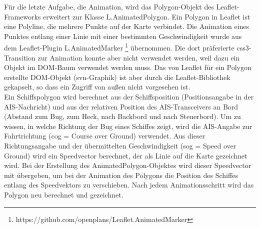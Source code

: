 Für díe letzte Aufgabe, die Animation, wird das Polygon-Objekt des Leaflet-Frameworks erweitert zur Klasse L.AnimatedPolygon. Ein Polygon in Leaflet ist eine Polyline, die mehrere Punkte auf der Karte verbindet. Die Animation eines Punktes entlang einer Linie mit einer bestimmten Geschwindigkeit wurde aus dem Leaflet-Plugin L.AnimatedMarker \footnote{\label{foot:2}https://github.com/openplans/Leaflet.AnimatedMarker} übernommen. Die dort präferierte css3-Transition zur Animation konnte aber nicht verwendet werden, weil dazu ein Objekt im DOM-Baum verwendet werden muss. Das von Leaflet für ein Polygon erstellte DOM-Objekt (svn-Graphik) ist aber durch die Leaflet-Bibliothek gekapselt, so dass ein Zugriff von außen nicht vorgesehen ist.  \\

Ein Schiffspolygon wird berechnet aus der Schiffsposition (Positionsangabe in der AIS-Nachricht) und aus der relativen Position des AIS-Transceivers an Bord (Abstand zum Bug, zum Heck, nach Backbord und nach Steuerbord). Um zu wissen, in welche Richtung der Bug eines Schiffes zeigt, wird die AIS-Angabe zur Fahrtrichtung (cog = Course over Ground) verwendet. Aus dieser Richtungsangabe und der übermittelten Geschwindigkeit (sog = Speed over Ground) wird ein Speedvector berechnet, der als Linie auf die Karte gezeichnet wird. Bei der Erstellung des AnimatedPolygon-Objektes wird dieser Speedvector mit übergeben, um bei der Animation des Polygons die Position des Schiffes entlang des Speedvektors zu verschieben. Nach jedem Animationsschritt wird das Polygon neu berechnet und gezeichnet.


